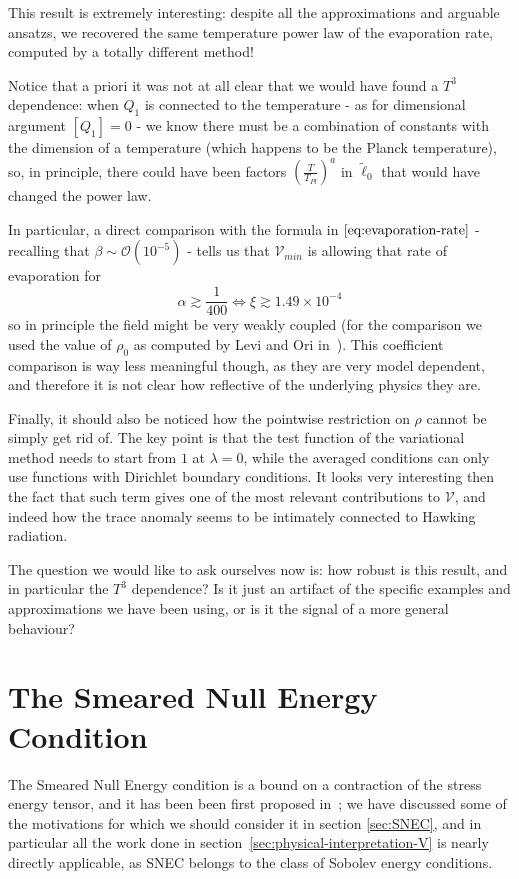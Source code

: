 This result is extremely interesting: despite all the approximations and arguable ansatzs, we recovered the same temperature power law of the evaporation rate, computed by a totally different method! 

\begin{remark}
	Notice that a priori it was not at all clear that we would have found a \(T^3\) dependence: when \(Q_1\) is connected to the temperature - as for dimensional argument \(\left[Q_1\right] = 0\) - we know there must be a combination of constants with the dimension of a temperature (which happens to be the Planck temperature), so, in principle, there could have been factors \(\left(\frac{T}{T_{Pl}}\right)^a\) in \(\tilde{\ell}_0\) that would have changed the power law.
\end{remark}

In particular, a direct comparison with the formula in \(\eqref{eq:evaporation-rate}\) - recalling that  \(\beta \sim \mathcal{O}(10^{-5})\) - tells us that \(\mathcal{V}_{min}\) is allowing that rate of evaporation for 
\[
\alpha \gtrsim \frac{1}{400} \iff \xi \gtrsim 1.49 \times 10^{-4}	
\]
so in principle the field might be very weakly coupled (for the comparison we used the value of \(\rho_0\) as computed by Levi and Ori in~\cite[]{levi2016versatile}). This coefficient comparison is way less meaningful though, as they are very model dependent, and therefore it is not clear how reflective of the underlying physics they are.

Finally, it should also be noticed how the pointwise restriction on \(\rho\) cannot be simply get rid of. The key point is that the test function of the variational method needs to start from \(1\) at \(\lambda = 0\), while the averaged conditions can only use functions with Dirichlet boundary conditions. It looks very interesting then the fact that such term gives one of the most relevant contributions to \(\mathcal{V}\), and indeed how the trace anomaly seems to be intimately connected to Hawking radiation. 

The question we would like to ask ourselves now is: how robust is this result, and in particular the \(T^3\) dependence? Is it just an artifact of the specific examples and approximations we have been using, or is it the signal of a more general behaviour? 

\section{The Smeared Null Energy Condition}
The Smeared Null Energy condition is a bound on a contraction of the stress energy tensor, and it has been been first proposed in~\cite{freivogel2018smeared}; we have discussed some of the motivations for which we should consider it in section \ref{sec:SNEC}, and in particular all the work done in section~\ref{sec:physical-interpretation-V} is nearly directly applicable, as SNEC belongs to the class of Sobolev energy conditions.


